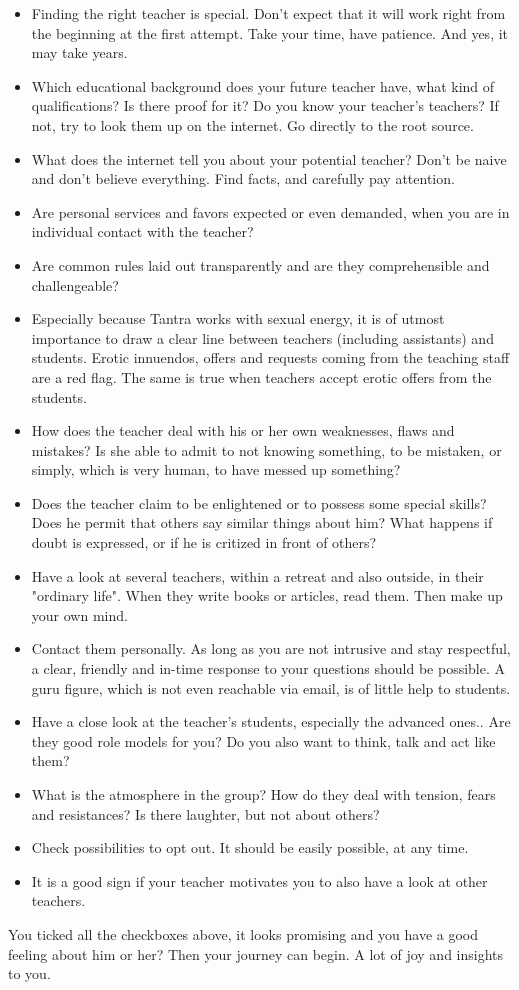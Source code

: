 \begin{itemize}
\item Finding the right teacher is special. Don't expect that it will work right from the beginning at the first attempt. Take your time, have patience. And yes, it may take years.
\item Which educational background does your future teacher have, what kind of qualifications? Is there proof for it? Do you know your teacher's teachers? If not, try to look them up on the internet. Go directly to the root source.
\item What does the internet tell you about your potential teacher? Don't be naive and don’t believe everything. Find facts, and carefully pay attention.
\item Are personal services and favors expected or even demanded, when you are in individual contact with the teacher?
\item Are common rules laid out transparently and are they comprehensible and challengeable?
\item Especially because Tantra works with sexual energy, it is of utmost importance to draw a clear line between teachers (including assistants) and students. Erotic innuendos, offers and requests coming from the teaching staff are a red flag. The same is true when teachers accept erotic offers from the students.
\item How does the teacher deal with his or her own weaknesses, flaws and mistakes? Is she able to admit to not knowing something, to be mistaken, or simply, which is very human, to have messed up something?
\item Does the teacher claim to be enlightened or to possess some special skills? Does he permit that others say similar things about him? What happens if doubt is expressed, or if he is critized in front of others?
\item Have a look at several teachers, within a retreat and also outside, in their "ordinary life". When they write books or articles, read them. Then make up your own mind.
\item Contact them personally. As long as you are not intrusive and stay respectful, a clear, friendly and in-time response to your questions should be possible. A guru figure, which is not even reachable via email, is of little help to students.
\item Have a close look at the teacher’s students, especially the advanced ones.. Are they good role models for you? Do you also want to think, talk and act like them?
\item What is the atmosphere in the group? How do they deal with tension, fears and resistances? Is there laughter, but not about others?
\item Check possibilities to opt out. It should be easily possible, at any time.
\item It is a good sign if your teacher motivates you to also have a look at other teachers.
\end{itemize}

You ticked all the checkboxes above, it looks promising and you have a good feeling about him or her? Then your journey can begin. A lot of joy and insights to you.
